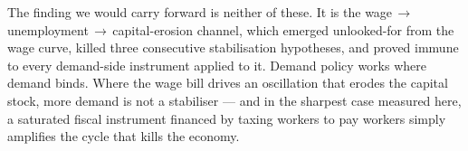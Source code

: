 The finding we would carry forward is neither of these. It is the
wage$\,\to\,$unemployment$\,\to\,$capital-erosion channel, which emerged
unlooked-for from the wage curve, killed three consecutive stabilisation
hypotheses, and proved immune to every demand-side instrument applied to it.
Demand policy works where demand binds. Where the wage bill drives an
oscillation that erodes the capital stock, more demand is not a stabiliser ---
and in the sharpest case measured here, a saturated fiscal instrument financed
by taxing workers to pay workers simply amplifies the cycle that kills the
economy.
